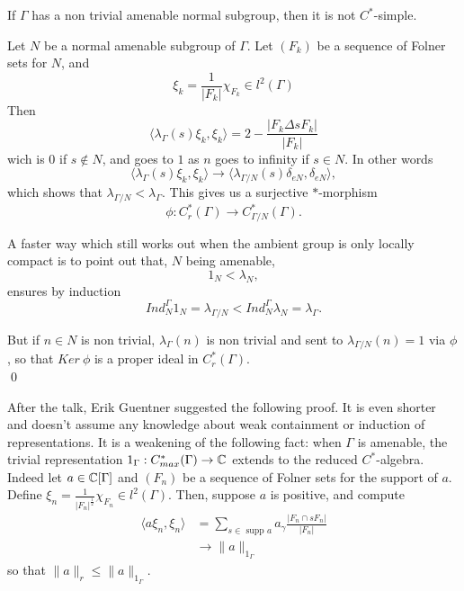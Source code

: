 \begin{thm}
If $\Gamma $ has a non trivial amenable normal subgroup, then it is not $C^*$-simple.
\end{thm}

\begin{dem}
Let $N$ be a normal amenable subgroup of $\Gamma$. Let $(F_k)$ be a sequence of Folner sets for $N$, and 
\[\xi_k =\frac{1}{|F_k|}\chi_{F_k}\in l^2(\Gamma)\]
Then
\[\langle \lambda_\Gamma(s)\xi_k, \xi_k\rangle = 2- \frac{|F_k \Delta sF_k |}{|F_k|} \]
wich is $0$ if $s\notin N$, and goes to $1$ as $n$ goes to infinity if $s\in N$. In other words
\[\langle \lambda_\Gamma(s)\xi_k, \xi_k\rangle \rightarrow \langle \lambda_{\Gamma/N}(s)\delta_{eN} , \delta_{eN} \rangle,\]
which shows that $\lambda_{\Gamma / N} < \lambda_\Gamma$. This gives us a surjective $*$-morphism 
\[\phi : C^*_r(\Gamma)\rightarrow C^*_{\Gamma/N}(\Gamma).\]

A faster way which still works out when the ambient group is only locally compact is to point out that, $N$ being amenable, 
\[1_N < \lambda_N,\]
ensures by induction 
\[Ind_N^\Gamma 1_N = \lambda_{\Gamma / N} < Ind_N^\Gamma \lambda_N= \lambda_{\Gamma }.\]

But if $n\in N$ is non trivial, $\lambda_{\Gamma}(n)$ is non trivial and sent to $\lambda_{\Gamma /N}(n) = 1$ via $\phi$, so that $Ker\ \phi$ is a proper ideal in $C^*_r(\Gamma)$.\\	
\qed	 
\end{dem}

After the talk, Erik Guentner suggested the following proof. It is even shorter and doesn't assume any knowledge about weak containment or induction of representations. It is a weakening of the following fact: when $\Gamma$ is amenable, the trivial representation $1_\Gamma : C^*_{max}(\Gamma)\rightarrow \mathbb C$ extends to the reduced $C^*$-algebra.\\

Indeed let $a\in \mathbb C [\Gamma]$ and $(F_n)$ be a sequence of Folner sets for the support of $a$. Define $\xi_n = \frac{1}{|F_n|^\frac{1}{2}} \chi_{F_n} \in l^2(\Gamma )$. Then, suppose $a$ is positive, and compute
\[\begin{split}
\langle a \xi_n , \xi_n \rangle & = \sum_{s\in \text{ supp }a} a_\gamma \frac{|F_n \cap sF_n|}{|F_n|} \\ 
				& \rightarrow \| a \|_{1_\Gamma}
\end{split}\]
so that $ \| a\|_r \leq \| a\|_{1_\Gamma} $.\\

